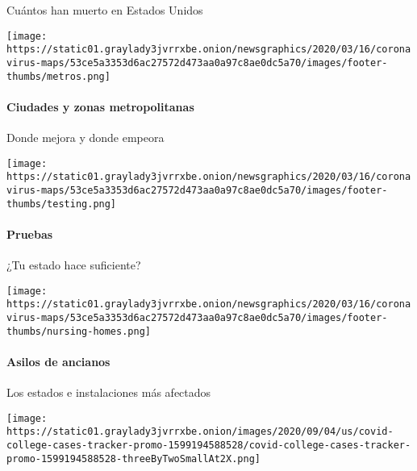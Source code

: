 Cuántos han muerto en Estados Unidos

\href{https://www.nytimes3xbfgragh.onion/interactive/2020/04/23/upshot/five-ways-to-monitor-coronavirus-outbreak-us.html}{}

\texttt{[image: https://static01.graylady3jvrrxbe.onion/newsgraphics/2020/03/16/coronavirus-maps/53ce5a3353d6ac27572d473aa0a97c8ae0dc5a70/images/footer-thumbs/metros.png]}

\hypertarget{ciudades-y-zonas-metropolitanas}{%
\paragraph{Ciudades y zonas
metropolitanas}\label{ciudades-y-zonas-metropolitanas}}

Donde mejora y donde empeora

\href{https://www.nytimes3xbfgragh.onion/interactive/2020/us/coronavirus-testing.html}{}

\texttt{[image: https://static01.graylady3jvrrxbe.onion/newsgraphics/2020/03/16/coronavirus-maps/53ce5a3353d6ac27572d473aa0a97c8ae0dc5a70/images/footer-thumbs/testing.png]}

\hypertarget{pruebas}{%
\paragraph{Pruebas}\label{pruebas}}

¿Tu estado hace suficiente?

\href{https://www.nytimes3xbfgragh.onion/interactive/2020/us/coronavirus-nursing-homes.html}{}

\texttt{[image: https://static01.graylady3jvrrxbe.onion/newsgraphics/2020/03/16/coronavirus-maps/53ce5a3353d6ac27572d473aa0a97c8ae0dc5a70/images/footer-thumbs/nursing-homes.png]}

\hypertarget{asilos-de-ancianos}{%
\paragraph{Asilos de ancianos}\label{asilos-de-ancianos}}

Los estados e instalaciones más afectados

\href{https://www.nytimes3xbfgragh.onion/interactive/2020/us/covid-college-cases-tracker.html}{}

\texttt{[image: https://static01.graylady3jvrrxbe.onion/images/2020/09/04/us/covid-college-cases-tracker-promo-1599194588528/covid-college-cases-tracker-promo-1599194588528-threeByTwoSmallAt2X.png]}

